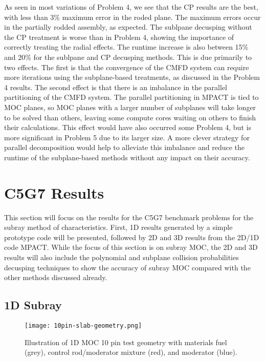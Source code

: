 As seen in most variations of Problem 4, we see that the CP results are the best, with less than 3\% maximum error in the roded plane.  The maximum errors occur in the partially rodded assembly, as expected.  The sublpane decusping without the CP treatment is worse than in Problem 4, showing the importance of correctly treating the radial effects.  The runtime increase is also between 15\% and 20\% for the sublpane and CP decusping methods.  This is due primarily to two effects.  The first is that the convergence of the CMFD system can require more iterations using the subplane-based treatments, as discussed in the Problem 4 results.  The second effect is that there is an imbalance in the parallel partitioning of the CMFD system.  The parallel partitioning in MPACT is tied to MOC planes, so MOC planes with a larger number of subplanes will take longer to be solved than others, leaving some compute cores waiting on others to finish their calculations.  This effect would have also occurred some Problem 4, but is more significant in Problem 5 due to its larger size.  A more clever strategy for parallel decomposition would help to alleviate this imbalance and reduce the runtime of the subplane-based methods without any impact on their accuracy.

\section{C5G7 Results}

This section will focus on the results for the C5G7 benchmark problems for the subray method of characteristics.  First, 1D results generated by a simple prototype code will be presented, followed by 2D and 3D results from the 2D/1D code MPACT.  While the focus of this section is on subray MOC, the 2D and 3D results will also include the polynomial and subplane collision probabilities decusping techniques to show the accuracy of subray MOC compared with the other methods discussed already.

\subsection{1D Subray}

\begin{figure}[h]
    \centering
    \texttt{[image: 10pin-slab-geometry.png]}
    \caption[Illustration of 1D MOC 10 Pin Geometry]{Illustration of 1D MOC 10 pin test geometry with materials fuel (grey), control rod/moderator mixture (red), and moderator (blue).}\label{f:10pin-geom}
\end{figure}

